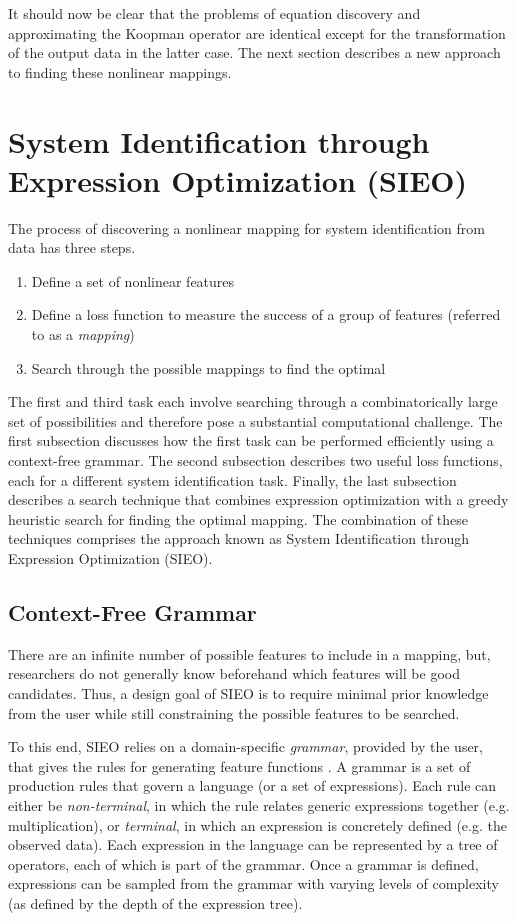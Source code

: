 \documentclass{article}
\begin{document}
It should now be clear that the problems of equation discovery and approximating the Koopman operator are identical except for the transformation of the output data in the latter case. The next section describes a new approach to finding these nonlinear mappings.

\section{System Identification through Expression Optimization (SIEO)}
\label{sieo}
The process of discovering a nonlinear mapping for system identification from data has three steps.
\begin{enumerate}
    \item Define a set of nonlinear features
    \item Define a loss function to measure the success of a group of features (referred to as a \textit{mapping})
    \item Search through the possible mappings to find the optimal
\end{enumerate}
The first and third task each involve searching through a combinatorically large set of possibilities and therefore pose a substantial computational challenge. The first subsection discusses how the first task can be performed efficiently using a context-free grammar. The second subsection describes two useful loss functions, each for a different system identification task. Finally, the last subsection describes a search technique that combines expression optimization with a greedy heuristic search for finding the optimal mapping. The combination of these techniques comprises the approach known as System Identification through Expression Optimization (SIEO).

\subsection{Context-Free Grammar}

There are an infinite number of possible features to include in a mapping, but, researchers do not generally know beforehand which features will be good candidates. Thus, a design goal of SIEO is to require minimal prior knowledge from the user while still constraining the possible features to be searched.

To this end, SIEO relies on a domain-specific \textit{grammar}, provided by the user, that gives the rules for generating feature functions \cite{kochenderfer2019algorithms}. A grammar is a set of production rules that govern a language (or a set of expressions). Each rule can either be \textit{non-terminal}, in which the rule relates generic expressions together (e.g. multiplication), or \textit{terminal}, in which an expression is concretely defined (e.g. the observed data). Each expression in the language can be represented by a tree of operators, each of which is part of the grammar. Once a grammar is defined, expressions can be sampled from the grammar with varying levels of complexity (as defined by the depth of the expression tree).
\end{document}
